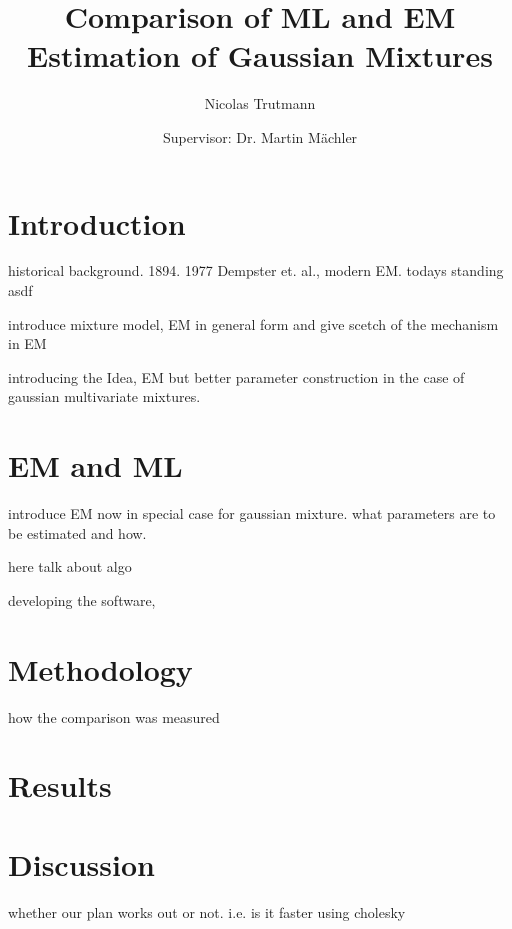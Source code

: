 


\title{Comparison of ML and EM Estimation of Gaussian Mixtures}
\author{Nicolas Trutmann \and Supervisor: Dr. Martin Mächler}




\maketitle

\tableofcontents

\section{Introduction}

historical background. 1894. 1977 Dempster et. al., modern EM. todays standing
asdf \cite{McLGP00}

introduce mixture model, EM in general form and give scetch of the mechanism in EM

introducing the Idea, EM but better parameter construction in the case of gaussian multivariate mixtures.

\section{EM and ML}

introduce EM now in special case for gaussian mixture. what parameters are to be estimated and how.

here talk about algo

developing the software,

\section{Methodology}

how the comparison was measured

\section{Results}

\section{Discussion}

whether our plan works out or not. i.e. is it faster using cholesky






